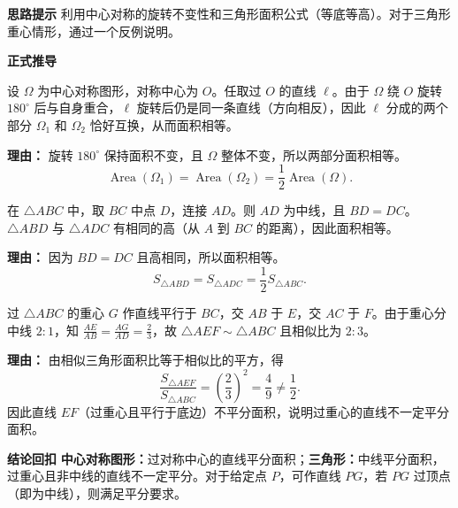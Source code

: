 \begin{proofbox}
	\textbf{\textcolor{CProof}{思路提示}}
	利用中心对称的旋转不变性和三角形面积公式（等底等高）。对于三角形重心情形，通过一个反例说明。

	\medskip
	\textbf{\textcolor{CProof}{正式推导}}
	\begin{description}[style=nextline, leftmargin=2.8em, labelsep=0.5em, itemsep=0.55em]
		\item[\textbf{步骤一（旋转对称）：}]
			设 $\Omega$ 为中心对称图形，对称中心为 $O$。任取过 $O$ 的直线 $\ell$。由于 $\Omega$ 绕 $O$ 旋转 $180^\circ$ 后与自身重合，$\ell$ 旋转后仍是同一条直线（方向相反），因此 $\ell$ 分成的两个部分 $\Omega_1$ 和 $\Omega_2$ 恰好互换，从而面积相等。
			\par\textbf{理由：} 旋转 $180^\circ$ 保持面积不变，且 $\Omega$ 整体不变，所以两部分面积相等。
			\[
				\operatorname{Area}(\Omega_1)=\operatorname{Area}(\Omega_2)=\frac12\operatorname{Area}(\Omega).
			\]
		\item[\textbf{步骤二（等底等高）：}]
			在 $\triangle ABC$ 中，取 $BC$ 中点 $D$，连接 $AD$。则 $AD$ 为中线，且 $BD=DC$。$\triangle ABD$ 与 $\triangle ADC$ 有相同的高（从 $A$ 到 $BC$ 的距离），因此面积相等。
			\par\textbf{理由：} 因为 $BD=DC$ 且高相同，所以面积相等。
			\[
				S_{\triangle ABD}=S_{\triangle ADC}=\frac12 S_{\triangle ABC}.
			\]
		\item[\textbf{步骤三（反例说明）：}]
			过 $\triangle ABC$ 的重心 $G$ 作直线平行于 $BC$，交 $AB$ 于 $E$，交 $AC$ 于 $F$。由于重心分中线 $2:1$，知 $\frac{AE}{AB}=\frac{AG}{AD}=\frac23$，故 $\triangle AEF\sim\triangle ABC$ 且相似比为 $2:3$。
			\par\textbf{理由：} 由相似三角形面积比等于相似比的平方，得
			\[
				\frac{S_{\triangle AEF}}{S_{\triangle ABC}}=\left(\frac23\right)^2=\frac49\neq\frac12.
			\]
			因此直线 $EF$（过重心且平行于底边）不平分面积，说明过重心的直线不一定平分面积。
	\end{description}

	\medskip
	\textbf{\textcolor{CProof}{结论回扣}}
	\textbf{中心对称图形：}过对称中心的直线平分面积；\textbf{三角形：}中线平分面积，过重心且非中线的直线不一定平分。对于给定点 $P$，可作直线 $PG$，若 $PG$ 过顶点（即为中线），则满足平分要求。
\end{proofbox}
